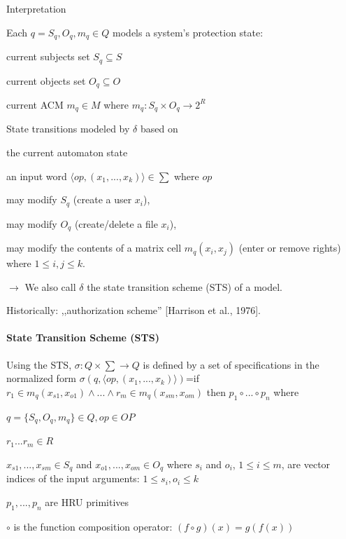 \documentclass[a4paper]{article}
\begin{document}
\begin{multicols}{3}
    Interpretation
    \begin{itemize*}
        \item Each $q=S_q,O_q,m_q\in Q$ models a system’s protection state:
        \begin{itemize*}
            \item current subjects set $S_q\subseteq S$
            \item current objects set $O_q\subseteq O$
            \item current ACM $m_q\in M$ where $m_q:S_q\times O_q\rightarrow 2^R$
        \end{itemize*}
        \item State transitions modeled by $\delta$ based on
        \begin{itemize*}
            \item the current automaton state
            \item an input word $\langle op,(x_1,...,x_k)\rangle \in\sum$ where $op$
            \item may modify $S_q$ (create a user $x_i$),
            \item may modify $O_q$ (create/delete a file $x_i$),
            \item may modify the contents of a matrix cell $m_q(x_i,x_j)$ (enter or remove rights) where $1\leq i,j\leq k$.
            \item[$\rightarrow$] We also call $\delta$ the state transition scheme (STS) of a model.
            \item Historically: ,,authorization scheme'' [Harrison et al., 1976].
        \end{itemize*}
    \end{itemize*}

    \paragraph{State Transition Scheme (STS)}
    Using the STS, $\sigma:Q\times\sum\rightarrow Q$ is defined by a set of specifications in the normalized form
    $\sigma(q,\langle op,(x_1,...,x_k)\rangle )$=if $r_1\in m_q(x_{s1},x_{o1}) \wedge ... \wedge r_m\in m_q(x_{sm},x_{om})$ then $p_1\circ ...\circ p_n$ where
    \begin{itemize*}
        \item $q=\{S_q,O_q,m_q\}\in Q,op\in OP$
        \item $r_1 ...r_m\in R$
        \item $x_{s1},...,x_{sm}\in S_q$ and $x_{o1},...,x_{om}\in O_q$ where $s_i$ and $o_i$, $1\leq i\leq m$, are vector indices of the input arguments: $1\leq s_i,o_i\leq k$
        \item $p_1,...,p_n$ are HRU primitives
        \item $\circ$ is the function composition operator: $(f\circ g)(x)=g(f(x))$
    \end{itemize*}


\end{multicols}
\end{document}
